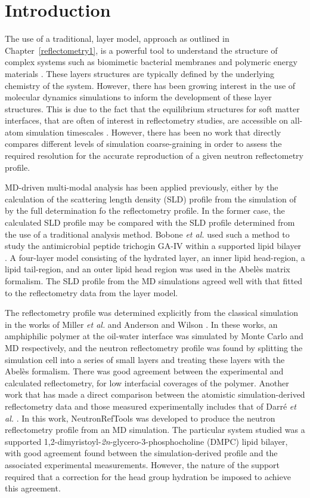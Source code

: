\section{Introduction}
The use of a traditional, layer model, approach as outlined in Chapter~\ref{reflectometry1}, is a powerful tool to understand the structure of complex systems such as biomimetic bacterial membranes \cite{barker_neutron_2016} and polymeric energy materials \cite{khodakarimi_x-ray_2016}.
These layers structures are typically defined by the underlying chemistry of the system.
However, there has been growing interest in the use of molecular dynamics simulations to inform the development of these layer structures.
This is due to the fact that the equilibrium structures for soft matter interfaces, that are often of interest in reflectometry studies, are accessible on all-atom simulation timescales \cite{scoppola_combining_2018}.
However, there has been no work that directly compares different levels of simulation coarse-graining in order to assess the required resolution for the accurate reproduction of a given neutron reflectometry profile.

MD-driven multi-modal analysis has been applied previously, either by the calculation of the scattering length density (SLD) profile from the simulation of by the full determination fo the reflectometry profile.
In the former case, the calculated SLD profile may be compared with the SLD profile determined from the use of a traditional analysis method.
Bobone \emph{et al.} used such a method to study the antimicrobial peptide trichogin GA-IV within a supported lipid bilayer \cite{bobone_membrane_2013}.
A four-layer model consisting of the hydrated  layer, an inner lipid head-region, a lipid tail-region, and an outer lipid head region was used in the Abel\`{e}s matrix formalism.
The SLD profile from the MD simulations agreed well with that fitted to the reflectometry data from the layer model.

The reflectometry profile was determined explicitly from the classical simulation in the works of Miller \emph{et al.} and Anderson and Wilson \cite{miller_monte_2003,anderson_molecular_2004}.
In these works, an amphiphilic polymer at the oil-water interface was simulated by Monte Carlo and MD respectively, and the neutron reflectometry profile was found by splitting the simulation cell into a series of small layers and treating these layers with the Abel\`{e}s formalism.
There was good agreement between the experimental and calculated reflectometry, for low interfacial coverages of the polymer.
Another work that has made a direct comparison between the atomistic simulation-derived reflectometry data and those measured experimentally includes that of Darr\'{e} \emph{et al.} \cite{darre_molecular_2015}.
In this work, NeutronRefTools was developed to produce the neutron reflectometry profile from an MD simulation.
The particular system studied was a supported 1,2-dimyristoyl-\emph{2n}-glycero-3-phosphocholine (DMPC) lipid bilayer, with good agreement found between the simulation-derived profile and the associated experimental measurements.
However, the nature of the support required that a correction for the head group hydration be imposed to achieve this agreement.

